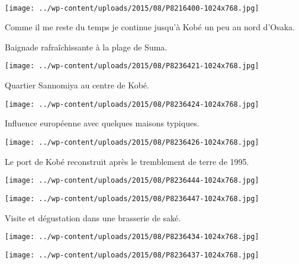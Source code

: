 ~\\
\vspace{1.5mm}
\begin{center} \texttt{[image: ../wp-content/uploads/2015/08/P8216400-1024x768.jpg]} \end{center}

 Comme il me reste du temps je continue jusqu'à Kobé un peu au nord d'Osaka. 

 Baignade rafraîchissante à la plage de Suma.
\begin{center} \texttt{[image: ../wp-content/uploads/2015/08/P8236421-1024x768.jpg]} \end{center}
\vspace{-\topsep}
\pagebreak
 
 Quartier Sannomiya au centre de Kobé.
\begin{center} \texttt{[image: ../wp-content/uploads/2015/08/P8236424-1024x768.jpg]} \end{center}

 Influence européenne avec quelques maisons typiques.
\begin{center} \texttt{[image: ../wp-content/uploads/2015/08/P8236426-1024x768.jpg]} \end{center}
\vspace{-\topsep}
\pagebreak
 
 Le port de Kobé reconstruit après le tremblement de terre de 1995.
\begin{center} \texttt{[image: ../wp-content/uploads/2015/08/P8236444-1024x768.jpg]} \end{center}
\begin{center} \texttt{[image: ../wp-content/uploads/2015/08/P8236447-1024x768.jpg]} \end{center}
\vspace{-\topsep}
\vspace{-3.25mm}
\pagebreak
 
 Visite et dégustation dans une brasserie de saké.
\begin{center} \texttt{[image: ../wp-content/uploads/2015/08/P8236434-1024x768.jpg]} \end{center}
\begin{center} \texttt{[image: ../wp-content/uploads/2015/08/P8236437-1024x768.jpg]} \end{center}
\vspace{-\topsep}
\vspace{-3.25mm}
\pagebreak
 
